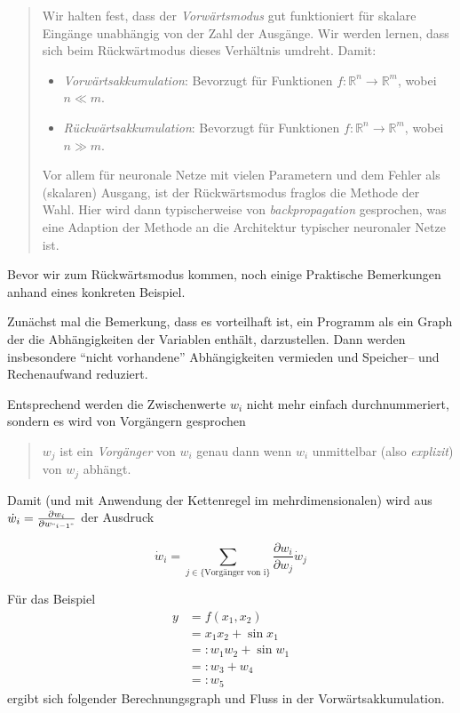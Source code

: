 \documentclass[
]{book}
\providecommand{\tightlist}{%
  \setlength{\itemsep}{0pt}\setlength{\parskip}{0pt}}
\newenvironment {JHSAYS} [0] {\begin{quote}\color{jhsc}} {\end{quote}}
\theoremstyle{definition}
\theoremstyle{definition}
\theoremstyle{definition}
\theoremstyle{definition}
\theoremstyle{remark}
\begin{document}
\leavevmode{}%
\begin{JHSAYS}
Wir halten fest, dass der \emph{Vorwärtsmodus} gut funktioniert für skalare
Eingänge unabhängig von der Zahl der Ausgänge. Wir werden lernen,
dass sich beim Rückwärtmodus dieses Verhältnis umdreht. Damit:

\begin{itemize}
\tightlist
\item
  \emph{Vorwärtsakkumulation}: Bevorzugt für Funktionen \(f \colon \mathbb{R}^n \rightarrow \mathbb{R}^m\), wobei \(n \ll m\).
\item
  \emph{Rückwärtsakkumulation}: Bevorzugt für Funktionen \(f\colon \mathbb{R}^n \rightarrow \mathbb{R}^m\), wobei \(n \gg m\).
\end{itemize}

Vor allem für neuronale Netze mit vielen Parametern und dem Fehler als
(skalaren) Ausgang, ist der Rückwärtsmodus fraglos die Methode der
Wahl. Hier wird dann typischerweise von \emph{backpropagation} gesprochen, was eine
Adaption der Methode an die Architektur typischer neuronaler Netze ist.

\end{JHSAYS}

Bevor wir zum Rückwärtsmodus kommen, noch einige Praktische
Bemerkungen anhand eines konkreten Beispiel.

Zunächst mal die Bemerkung, dass es vorteilhaft ist, ein Programm als ein Graph der
die Abhängigkeiten der Variablen enthält, darzustellen. Dann werden
insbesondere ``nicht vorhandene'' Abhängigkeiten vermieden und Speicher-- und
Rechenaufwand reduziert.

Entsprechend werden die Zwischenwerte \(w_i\) nicht mehr einfach durchnummeriert,
sondern es wird von Vorgängern gesprochen

\begin{quote}
\(w_j\) ist ein \emph{Vorgänger} von \(w_i\) genau dann wenn \(w_i\) unmittelbar
(also \emph{explizit}) von \(w_j\) abhängt.
\end{quote}

Damit (und mit Anwendung der Kettenregel im mehrdimensionalen) wird aus
\(\dot w_i = \frac{\partial w_i}{\partial w_{"i-1"}}\) der Ausdruck

\[
\dot w_i = \sum_{j \in \{\text{Vorgänger von i}\}} \frac{\partial w_i}{\partial w_j} \dot w_j
\]

Für das Beispiel
\begin{align*}
y
&= f(x_1, x_2) \\
&= x_1 x_2 + \sin x_1 \\
&=: w_1 w_2 + \sin w_1 \\
&=: w_3 + w_4 \\
&=: w_5
\end{align*}
ergibt sich folgender Berechnungsgraph und Fluss in der
Vorwärtsakkumulation.
\end{document}
